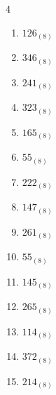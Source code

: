 \begin{multicols}{4}
\begin{enumerate}
        \phantom{$=135$}

  \item $126_{(8)}$

        \phantom{$=86$}

  \item $346_{(8)}$

        \phantom{$=230$}

  \item $241_{(8)}$

        \phantom{$=161$}

  \item $323_{(8)}$

        \phantom{$=211$}

  \item $165_{(8)}$

        \phantom{$=117$}

  \item $55_{(8)}$

        \phantom{$=45$}

  \item $222_{(8)}$

        \phantom{$=146$}

  \item $147_{(8)}$

        \phantom{$=103$}

  \item $261_{(8)}$

        \phantom{$=177$}

\columnbreak %

  \item $55_{(8)}$

        \phantom{$=45$}

  \item $145_{(8)}$

        \phantom{$=101$}

  \item $265_{(8)}$

        \phantom{$=181$}

  \item $114_{(8)}$

        \phantom{$=76$}

  \item $372_{(8)}$

        \phantom{$=250$}

  \item $214_{(8)}$

        \phantom{$=140$}


\end{enumerate}
\end{multicols}
